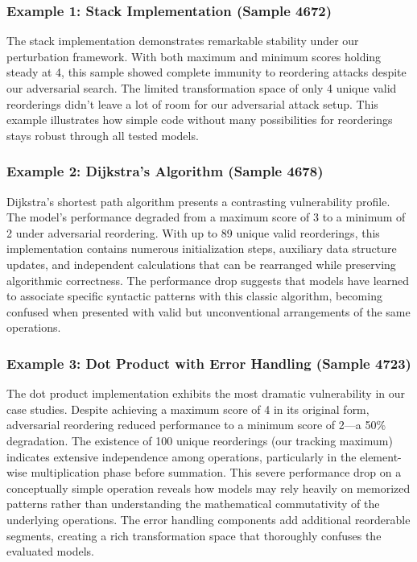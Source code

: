 \documentclass[%
thesis=student,%
coverpage=false,%
titlepage=false,%
headmarks=true, %
english,%
font=libertine, %
math=newpxtx, %
BCOR=5mm,%
coverBCOR=11mm%
]{tum-templates/book/tumbook}
\begin{document}
\subsubsection{Example 1: Stack Implementation (Sample 4672)}

The stack implementation demonstrates remarkable stability under our perturbation framework. With both maximum and minimum scores holding steady at 4, this sample showed complete immunity to reordering attacks despite our adversarial search. The limited transformation space of only 4 unique valid reorderings didn't leave a lot of room for our adversarial attack setup. This example illustrates how simple code without many possibilities for reorderings stays robust through all tested models.

\subsubsection{Example 2: Dijkstra's Algorithm (Sample 4678)}

Dijkstra's shortest path algorithm presents a contrasting vulnerability profile. The model's performance degraded from a maximum score of 3 to a minimum of 2 under adversarial reordering. With up to 89 unique valid reorderings, this implementation contains numerous initialization steps, auxiliary data structure updates, and independent calculations that can be rearranged while preserving algorithmic correctness. The performance drop suggests that models have learned to associate specific syntactic patterns with this classic algorithm, becoming confused when presented with valid but unconventional arrangements of the same operations.

\subsubsection{Example 3: Dot Product with Error Handling (Sample 4723)}

The dot product implementation exhibits the most dramatic vulnerability in our case studies. Despite achieving a maximum score of 4 in its original form, adversarial reordering reduced performance to a minimum score of 2—a 50\% degradation. The existence of 100 unique reorderings (our tracking maximum) indicates extensive independence among operations, particularly in the element-wise multiplication phase before summation. This severe performance drop on a conceptually simple operation reveals how models may rely heavily on memorized patterns rather than understanding the mathematical commutativity of the underlying operations. The error handling components add additional reorderable segments, creating a rich transformation space that thoroughly confuses the evaluated models.
\end{document}

